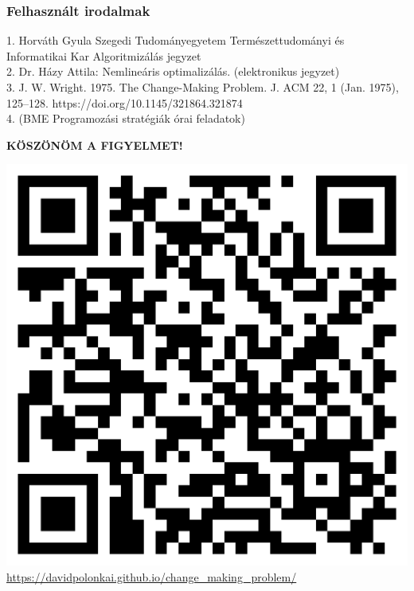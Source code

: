 \documentclass{beamer}
\begin{document}
\begin{frame}
    \frametitle{Felhasznált irodalmak}
    1. Horváth Gyula Szegedi Tudományegyetem Természettudományi és Informatikai Kar Algoritmizálás jegyzet\\
    2. Dr. Házy Attila: Nemlineáris optimalizálás. (elektronikus jegyzet)\\
    3. J. W. Wright. 1975. The Change-Making Problem. J. ACM 22, 1 (Jan. 1975), 125–128. https://doi.org/10.1145/321864.321874\\
    4. (BME Programozási stratégiák órai feladatok)
\end{frame}
\begin{frame}
    \textbf{KÖSZÖNÖM A FIGYELMET!}
\end{frame}
\begin{frame}
    \centering
    \includegraphics[scale=0.2]{qrcode.png}\\
    \small\url{https://davidpolonkai.github.io/change_making_problem/}
\end{frame}
\end{document}

